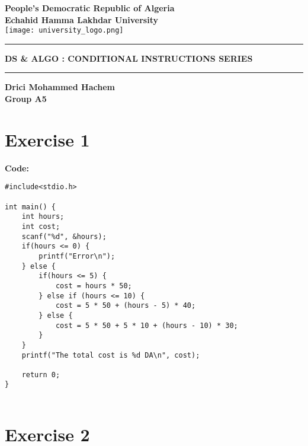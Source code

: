 \documentclass[12pt]{article}
\begin{document}
	
	\begin{titlepage}
		\centering
		\vspace*{2cm}
		
		\textbf{\Large People's Democratic Republic of Algeria}\\
		\vspace{0.5cm}
		\textbf{\large Echahid Hamma Lakhdar University}\\
		
		\vspace{1cm}
		\texttt{[image: university\_logo.png]} %
		
		\vspace{1.5cm}
		\rule{\textwidth}{1pt}
		\vspace{0.5cm}
		
		\textbf{\Large DS \& ALGO : CONDITIONAL INSTRUCTIONS SERIES}\\
		\vspace{0.5cm}
		\rule{\textwidth}{1pt}
		\vspace{0.5cm}
		
		\vspace{1.5cm}
		\textbf{\Huge Drici Mohammed Hachem}\\
		\vspace{0.5cm}
		\textbf{\Large Group A5}\\
		
		\vfill
	\end{titlepage}
	
	\newpage
	\section*{Exercise 1}
	 \vspace{0.5cm}
	 
	 \textbf{Code:}
\begin{lstlisting}
#include<stdio.h>

int main() {
	int hours;
	int cost;
	scanf("%d", &hours);
	if(hours <= 0) {
		printf("Error\n");
	} else {
		if(hours <= 5) {
			cost = hours * 50;
		} else if (hours <= 10) {
			cost = 5 * 50 + (hours - 5) * 40;
		} else {
			cost = 5 * 50 + 5 * 10 + (hours - 10) * 30;
		}
	}
	printf("The total cost is %d DA\n", cost); 
	
	return 0;
}
		 
\end{lstlisting}
	\vspace{1cm}

\section*{Exercise 2}
\vspace{0.5cm}
\end{document}
